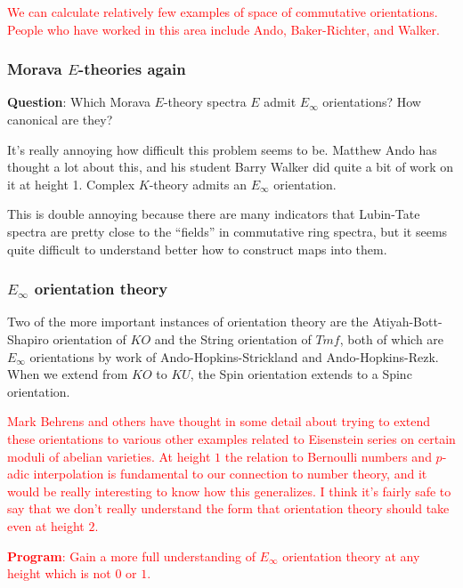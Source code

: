 \documentclass[12pt,titlepage]{article}
\newcommand{\rd}[1]{{\textcolor{red}{#1}}}
\theoremstyle{plain}
\theoremstyle{definition}
\theoremstyle{remark}
\begin{document}
\rd{We can calculate relatively few examples of space of commutative orientations. People who have worked in this area include Ando, Baker-Richter, and Walker.}

\hypertarget{morava_theories_again_9}{}\subsubsection{{Morava $E$-theories again}}\label{morava_theories_again_9}

\textbf{Question}: Which Morava $E$-theory spectra $E$ admit $E_\infty$ orientations? How canonical are they?

It'{}s really annoying how difficult this problem seems to be. Matthew Ando has thought a lot about this, and his student Barry Walker did quite a bit of work on it at height 1. Complex $K$-theory admits an $E_\infty$ orientation.

This is double annoying because there are many indicators that Lubin-Tate spectra are pretty close to the ``{}fields''{} in commutative ring spectra, but it seems quite difficult to understand better how to construct maps into them.

\hypertarget{_orientation_theory_10}{}\subsubsection{{$E_\infty$ orientation theory}}\label{_orientation_theory_10}

Two of the more important instances of orientation theory are the Atiyah-Bott-Shapiro orientation of $KO$ and the String orientation of $Tmf$, both of which are $E_\infty$ orientations by work of Ando-Hopkins-Strickland and Ando-Hopkins-Rezk. When we extend from $KO$ to $KU$, the Spin orientation extends to a Spin{\tt {}}c orientation.

\rd{Mark Behrens and others have thought in some detail about trying to extend these orientations to various other examples related to Eisenstein series on certain moduli of abelian varieties. At height $1$ the relation to Bernoulli numbers and $p$-adic interpolation is fundamental to our connection to number theory, and it would be really interesting to know how this generalizes. I think it'{}s fairly safe to say that we don'{}t really understand the form that orientation theory should take even at height $2$.}

\rd{\textbf{Program}: Gain a more full understanding of $E_\infty$ orientation theory at any height which is not $0$ or $1$.}
\end{document}
